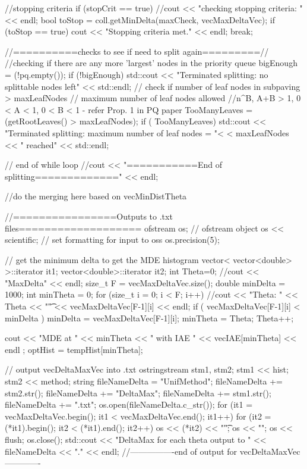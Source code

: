 \begin{DoxyCode}
{{{        //stopping criteria
        if (stopCrit == true) {
          //cout << "checking stopping criteria: " << endl;
          bool toStop = coll.getMinDelta(maxCheck, vecMaxDeltaVec);
          if (toStop == true) {
            cout << "Stopping criteria met." << endl;
            break;
          } 
        }

        //==========checks to see if need to split again=========//
            //checking if there are any more 'largest' nodes in the priority
       queue
            bigEnough = (!pq.empty());
            if (!bigEnough){    
          std::cout << "Terminated splitting: no splittable nodes left"
                    << std::endl;
            }
        // check if number of leaf nodes in subpaving > maxLeafNodes
        // maximum number of leaf nodes allowed
        //n^B, A+B > 1, 0  < A < 1, 0 < B < 1 - refer Prop. 1 in PQ paper
        TooManyLeaves = (getRootLeaves() > maxLeafNodes);
        if ( TooManyLeaves) {
          std::cout << "Terminated splitting: maximum number of leaf nodes = "<
      < maxLeafNodes << " reached"
                          << std::endl;
        }
      } // end of while loop
      //cout << "===========End of splitting=============" << endl;
        
      //do the merging here based on vecMinDistTheta
         
      //================Outputs to .txt files=================== 
      ofstream os;         // ofstream object
      os << scientific;  // set formatting for input to oss
      os.precision(5);

       // get the minimum delta to get the MDE histogram
      vector< vector<double> >::iterator it1; 
      vector<double>::iterator it2;
      int Theta=0;
      //cout << "MaxDelta" << endl;
      size_t F = vecMaxDeltaVec.size(); 
      double minDelta = 1000;
      int minTheta = 0;
      for (size_t i = 0; i < F; i++){
        //cout << "Theta: " << Theta << "\t" << vecMaxDeltaVec[F-1][i] << endl;
        if ( vecMaxDeltaVec[F-1][i] < minDelta ) { 
          minDelta = vecMaxDeltaVec[F-1][i]; 
          minTheta = Theta; 
        } 
        Theta++;
      }

      cout << "MDE at " << minTheta << " with IAE " << vecIAE[minTheta] << endl
      ; 
         optHist = tempHist[minTheta];

      // output vecDeltaMaxVec into .txt 
      ostringstream stm1, stm2;
      stm1 << hist;
      stm2 << method;
      string fileNameDelta = "UnifMethod";
      fileNameDelta += stm2.str();
      fileNameDelta += "DeltaMax";
      fileNameDelta += stm1.str();
      fileNameDelta += ".txt";  
      os.open(fileNameDelta.c_str());
      for (it1 = vecMaxDeltaVec.begin(); it1 < vecMaxDeltaVec.end(); it1++){ 
        for (it2 = (*it1).begin(); it2 < (*it1).end(); it2++){
          os << (*it2) << "\t";
        }
        os << "\n";
      }          
      os << flush;
      os.close();
      std::cout << "DeltaMax for each theta output to " << fileNameDelta << "."
       << endl;
      //----------------end of output for vecDeltaMaxVec-------------
 
}}
\end{DoxyCode}
